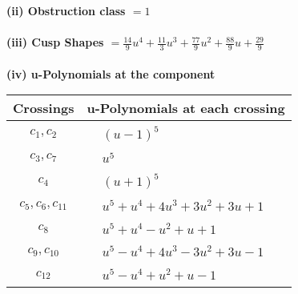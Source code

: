 \documentclass[1p]{elsarticle_modified}
\theoremstyle{definition}
\begin{document}
\flushleft \textbf{(ii) Obstruction class $= 1$}\\~\\
\flushleft \textbf{(iii) Cusp Shapes $= \frac{14}{9} u^4+\frac{11}{3} u^3+\frac{77}{9} u^2+\frac{88}{9} u+\frac{29}{9}$}\\~\\
\newpage\renewcommand{\arraystretch}{1}
\flushleft \textbf{(iv) u-Polynomials at the component}\newline \\
\begin{tabular}{m{50pt}|m{274pt}}
Crossings & \hspace{64pt}u-Polynomials at each crossing \\
\hline $$\begin{aligned}c_{1},c_{2}\end{aligned}$$&$\begin{aligned}
&(u-1)^5
\end{aligned}$\\
\hline $$\begin{aligned}c_{3},c_{7}\end{aligned}$$&$\begin{aligned}
&u^5
\end{aligned}$\\
\hline $$\begin{aligned}c_{4}\end{aligned}$$&$\begin{aligned}
&(u+1)^5
\end{aligned}$\\
\hline $$\begin{aligned}c_{5},c_{6},c_{11}\end{aligned}$$&$\begin{aligned}
&u^5+u^4+4 u^3+3 u^2+3 u+1
\end{aligned}$\\
\hline $$\begin{aligned}c_{8}\end{aligned}$$&$\begin{aligned}
&u^5+u^4- u^2+u+1
\end{aligned}$\\
\hline $$\begin{aligned}c_{9},c_{10}\end{aligned}$$&$\begin{aligned}
&u^5- u^4+4 u^3-3 u^2+3 u-1
\end{aligned}$\\
\hline $$\begin{aligned}c_{12}\end{aligned}$$&$\begin{aligned}
&u^5- u^4+u^2+u-1
\end{aligned}$\\
\hline
\end{tabular}\\~\\
\end{document}
